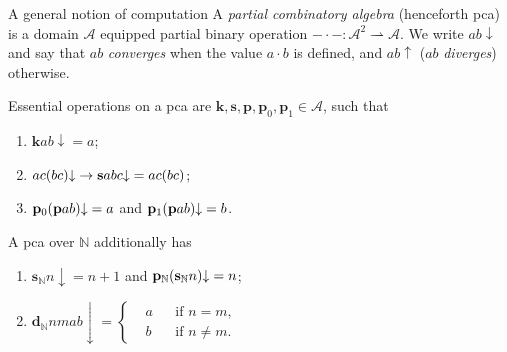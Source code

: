 \documentclass{beamer}
\begin{document}
\begin{frame}{A general notion of computation}
  A \emph{partial combinatory algebra} (henceforth pca) is a domain $\mathcal{A}$ equipped partial binary operation ${-} \cdot {-} : \mathcal{A}^2 \rightharpoonup \mathcal{A}$. We write $ab {\downarrow}$ and say that $ab$ \emph{converges} when the value $a \cdot b$ is defined, and $ab {\uparrow}$ ($ab$ \emph{diverges}) otherwise.

  \vspace{0.6em}

  Essential operations on a pca are $\mathbf{k}, \mathbf{s}, \mathbf{p}, \mathbf{p}_0, \mathbf{p}_1 \in \mathcal{A}$, such that
  \begin{enumerate}
    \item $\mathbf{k} ab {\downarrow} = a$;
    \item $ac \mleft(bc\mright) {\downarrow} \rightarrow \mathbf{s} abc {\downarrow} = ac \mleft(bc\mright)$;
    \item $\mathbf{p}_0 \mleft(\mathbf{p} ab\mright) {\downarrow} = a$ and $\mathbf{p}_1 \mleft(\mathbf{p} ab\mright) {\downarrow} = b$.
  \end{enumerate}

  \vspace{0.6em}

  A pca over $\mathbb{N}$ additionally has
  \begin{enumerate}
    \item $\mathbf{s}_\mathbb{N} n {\downarrow} = n + 1$ and $\mathbf{p}_\mathbb{N} \mleft(\mathbf{s}_\mathbb{N} n\mright) {\downarrow} = n$;
    \item $\mathbf{d}_\mathbb{N} nmab {\downarrow} = \left\{\begin{aligned}
               & a &  & \text{if $n = m$},    \\
               & b &  & \text{if $n \neq m$}.
            \end{aligned}\right.$
  \end{enumerate}
\end{frame}
\end{document}
